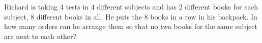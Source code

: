 Richard is taking $4$ tests in $4$ different subjects and has $2$ different books for each subject, $8$ different books in all. He puts the $8$ books in a row in his backpack. In how many orders can he arrange them so that no two books for the same subject are next to each other?
